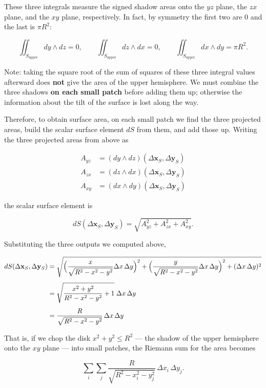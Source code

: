 These three integrals measure the signed shadow areas onto the \(yz\)
plane, the \(zx\) plane, and the \(xy\) plane, respectively. In fact, by
symmetry the first two are \(0\) and the last is \(\pi R^2\):

\[
\iint_{S_{\text{upper}}} dy\wedge dz=0,\qquad
\iint_{S_{\text{upper}}} dz\wedge dx=0,\qquad
\iint_{S_{\text{upper}}} dx\wedge dy=\pi R^2.
\]

Note: taking the square root of the sum of squares of these three
integral values afterward does \textbf{not} give the area of the upper
hemisphere. We must combine the three shadows
\textbf{on each small patch} before adding them up; otherwise the
information about the tilt of the surface is lost along the way.

Therefore, to obtain surface area, on each small patch we find the three
projected areas, build the scalar surface element \(dS\) from them, and
add those up. Writing the three projected areas from above as

\[\begin{aligned}
A_{yz} &= (dy \wedge dz)(\Delta\mathbf{x}_S,\Delta\mathbf{y}_S) \\
A_{zx} &= (dz \wedge dx)(\Delta\mathbf{x}_S,\Delta\mathbf{y}_S) \\
A_{xy} &= (dx \wedge dy)(\Delta\mathbf{x}_S,\Delta\mathbf{y}_S)
\end{aligned}\]

the scalar surface element is

\[
dS(\Delta\mathbf{x}_S,\Delta\mathbf{y}_S)
= \sqrt{A_{yz}^2+A_{zx}^2+A_{xy}^2}.
\]

Substituting the three outputs we computed above,

\[\begin{aligned}
dS(\Delta\mathbf{x}_S,\Delta\mathbf{y}_S)
&= \sqrt{
\Bigl(\frac{x}{\sqrt{R^2-x^2-y^2}}\Delta x\,\Delta y\Bigr)^2
{}+ \Bigl(\frac{y}{\sqrt{R^2-x^2-y^2}}\Delta x\,\Delta y\Bigr)^2
{}+ (\Delta x\,\Delta y)^2} \\[4pt]
&= \sqrt{\frac{x^2+y^2}{R^2-x^2-y^2}+1}\;\Delta x\,\Delta y \\[4pt]
&= \frac{R}{\sqrt{R^2-x^2-y^2}}\,\Delta x\,\Delta y
\end{aligned}\]

That is, if we chop the disk \(x^2+y^2 \le R^2\) --- the shadow of the
upper hemisphere onto the \(xy\) plane --- into small patches, the
Riemann sum for the area becomes

\[\sum_i\sum_j
\frac{R}{\sqrt{R^2-x_i^2-y_j^2}}\,
\Delta x_i\,\Delta y_j.\]

